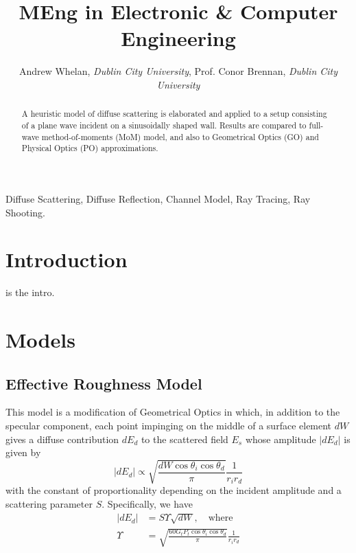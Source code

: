 \documentclass[lettersize,journal]{IEEEtran}
\title{MEng in Electronic \& Computer Engineering}
\author{Andrew Whelan, \emph{Dublin City University},
   Prof. Conor Brennan, \emph{Dublin City University}}
\begin{document}
\maketitle
\begin{abstract}
   A heuristic model of diffuse scattering is elaborated and applied to a setup
   consisting of a plane wave incident on a sinusoidally shaped wall.
   Results are compared to full-wave method-of-moments (MoM) model, and also to
   Geometrical Optics (GO) and Physical Optics (PO) approximations.
\end{abstract}
\begin{IEEEkeywords}
   Diffuse Scattering, Diffuse Reflection, Channel Model, Ray Tracing, Ray Shooting.
\end{IEEEkeywords}
\section{Introduction}
    is the intro.
\section{Models}
\subsection{Effective Roughness Model}
        This model is a modification of Geometrical Optics in which, in addition to the
        specular component, each point impinging on the middle of a surface element $dW$
        gives a diffuse contribution $dE_d$ to the scattered field $E_s$ whose amplitude
        $\left| dE_d \right|$ is given by
        \begin{equation} \label{eq:scatteringAmpER}
           \left| dE_d \right| \propto \sqrt{\frac{dW \cos \theta_i \cos \theta_d}{\pi}}
           \frac{1}{r_i r_d}
        \end{equation}
        with the constant of proportionality depending on the incident amplitude and a
        scattering parameter $S$. Specifically, we have
        \begin{subequations}
            \begin{align}
                \left| dE_d \right| &= S \Upsilon \sqrt{dW}, \quad \text{where} \\
                \Upsilon &= \sqrt{\frac{60 G_t P_t \cos \theta_i \cos \theta_d}{\pi}}
                \frac{1}{r_i r_d}
            \end{align}
        \end{subequations}
\end{document}
